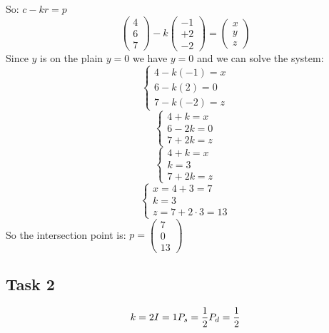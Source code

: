 \documentclass[tikz,14pt,fleqn]{article}
\begin{document}
So: $ c - k r = p $
\[
   \begin{pmatrix} 4 \\ 6 \\ 7 \end{pmatrix} - k \begin{pmatrix} -1 \\ +2 \\ -2 \end{pmatrix} = \begin{pmatrix} x \\ y \\ z \end{pmatrix}
\]
Since $y$ is on the plain $y = 0$ we have $y = 0$ and we can solve the system:
\[
   \begin{cases}
      4 - k (-1) = x \\
      6 - k (2) = 0 \\
      7 - k (-2) = z
   \end{cases}
\]
\[
   \begin{cases}
      4 + k = x \\
      6 - 2k = 0 \\
      7 + 2k = z
   \end{cases}
\]
\[
   \begin{cases}
      4 + k = x \\
      k = 3 \\
      7 + 2k = z
   \end{cases}
\]
\[
   \begin{cases}
      x = 4+3=7 \\
      k = 3 \\
      z = 7 + 2 \cdot 3 = 13
   \end{cases}
\]
So the intersection point is: $p = \begin{pmatrix} 7 \\ 0 \\ 13 \end{pmatrix}$


\subsection{Task 2}
\[
k = 2 \\
I = 1\\
P_s = \frac{1}{2}\\
P_d = \frac{1}{2}\\
\]
\end{document}
